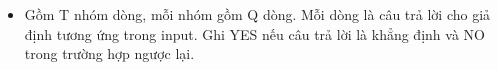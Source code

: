 \begin{itemize}
	\item Gồm T nhóm dòng, mỗi nhóm gồm Q dòng. Mỗi dòng là câu trả lời cho giả định tương ứng trong input. Ghi YES nếu câu trả lời là khẳng định và NO trong trường hợp ngược lại.
\end{itemize}